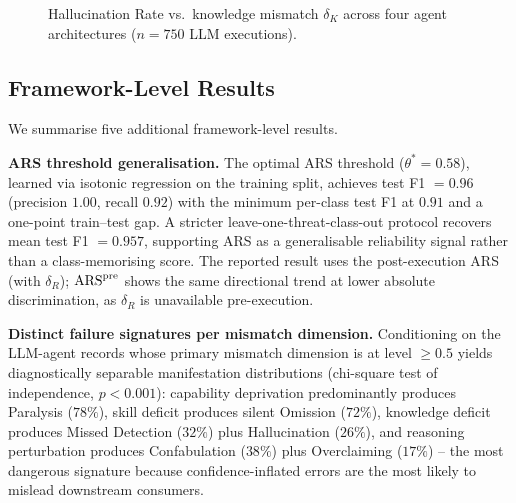 \begin{figure}[t]
\centering
{}
\caption{Hallucination Rate vs.\ knowledge mismatch $\delta_K$ across
four agent architectures ($n = 750$ LLM executions).}
\label{fig:e1_isaia}
\end{figure}

\subsection{Framework-Level Results}

We summarise five additional framework-level results.

\textbf{ARS threshold generalisation.} The optimal ARS threshold
($\theta^* = 0.58$), learned via isotonic regression on the training
split, achieves test F1 $= 0.96$ (precision $1.00$, recall $0.92$)
with the minimum per-class test F1 at $0.91$ and a one-point
train--test gap. A stricter leave-one-threat-class-out protocol
recovers mean test F1 $= 0.957$, supporting ARS as a generalisable
reliability signal rather than a class-memorising score.
The reported result uses the post-execution ARS (with $\delta_R$);
$\mathrm{ARS}^{\mathrm{pre}}$ shows the same directional trend at lower absolute
discrimination, as $\delta_R$ is unavailable pre-execution.

\textbf{Distinct failure signatures per mismatch dimension.}
Conditioning on the LLM-agent records whose primary mismatch
dimension is at level $\geq 0.5$ yields diagnostically separable
manifestation distributions (chi-square test of independence,
$p < 0.001$): capability deprivation predominantly produces Paralysis
($78\%$), skill deficit produces silent Omission ($72\%$), knowledge
deficit produces Missed Detection ($32\%$) plus Hallucination
($26\%$), and reasoning perturbation produces Confabulation ($38\%$)
plus Overclaiming ($17\%$) -- the most dangerous signature because
confidence-inflated errors are the most likely to mislead downstream
consumers.

